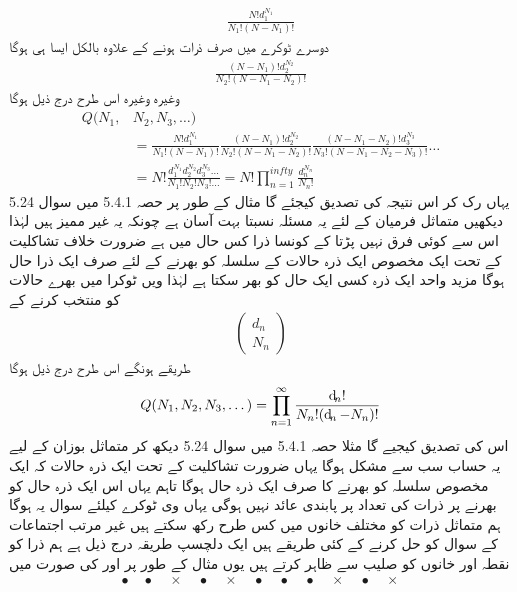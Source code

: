 \begin{align*}
\frac{N ! d_1^{N_1}}{N_1 ! (N - N_1) !}
\end{align*}
دوسرے ٹوکرے میں صرف  ذرات ہونے کے علاوہ بالکل ایسا ہی ہوگا 
\begin{align*}
\frac{(N - N_1) ! d_2^{N_2}}{N_2 ! (N - N_1 - N_2) !}
\end{align*}
وغیرہ وغیرہ اس طرح درج ذیل ہوگا 
\begin{align}
Q (N_1 , &N_2 , N_3 , \dotsc) \\
&= \frac{N ! d_1^{N_1}}{N_1 ! (N - N_1) !} \frac{(N - N_1) ! d_2^{N_2}}{N_2 ! (N - N_1 - N_2) !} \frac{(N - N_1 - N_2) ! d_3^{N_3}}{N_3 ! (N - N_1 - N_2 - N_3) !} \dotsc\\
&= N ! \frac{d_1^{N_1} d_2^{N_2} d_3^{N_3} \dotsc}{N_1 ! N_2 ! N_3 ! \dotsc} = N! \prod_{n = 1}^{infty} \frac{d_n^{N_n}}{N_n !}
\end{align}
یہاں رک کر اس نتیجہ کی تصدیق کیجئے گا مثال کے طور پر حصہ 5.4.1 میں سوال 5.24 دیکھیں متماثل فرمیان کے لئے یہ مسئلہ نسبتا بہت آسان ہے چونکہ یہ غیر ممیز ہیں لہٰذا اس سے کوئی فرق نہیں پڑتا کے کونسا ذرا کس حال میں ہے ضرورت خلاف تشاکلیت کے تحت ایک مخصوص ایک ذرہ حالات کے سلسلہ کو بھرنے کے لئے صرف ایک  ذرا حال ہوگا مزید واحد ایک ذرہ کسی ایک حال کو بھر سکتا ہے لہٰذا  ویں ٹوکرا میں  بهرے  حالات کو منتخب کرنے کے 
\begin{align*}
\begin{pmatrix}
d_n \\
N_n
\end{pmatrix}
\end{align*}
طریقے ہونگے اس طرح درج ذیل ہوگا 
\begin{align}
Q (N_1 , N_2 , N_3 , \dotsc ) = \prod_{n = 1}^{\infty} \frac{\dif_n !}{N_n ! (\dif_n - N_n) !}
\end{align}
اس کی تصدیق کیجیے گا مثلا حصہ 5.4.1 میں سوال 5.24 دیکھ کر متماثل بوزان کے لیے یہ حساب سب سے مشکل ہوگا یہاں ضرورت تشاکلیت کے تحت ایک ذرہ حالات کہ ایک مخصوص سلسلہ کو بھرنے کا صرف ایک  ذرہ حال ہوگا تاہم یہاں اس ایک ذرہ حال کو بھرنے پر ذرات کی تعداد پر پابندی عائد نہیں ہوگی یہاں  وی ٹوکرے کیلئے سوال یہ ہوگا ہم متماثل  ذرات کو  مختلف خانوں میں کس طرح رکھ سکتے ہیں غیر مرتب اجتماعات کے سوال کو حل کرنے کے کئی طریقے ہیں ایک دلچسپ طریقہ درج ذیل ہے ہم ذرا کو نقطہ اور خانوں کو صلیب سے ظاہر کرتے ہیں یوں مثال کے طور پر  اور  کی صورت میں
\begin{align*} 
\bullet \quad \bullet \quad \times \quad \bullet \quad \times \quad \bullet \quad \bullet \quad \bullet \quad \times \quad \bullet \quad \times
\end{align*}

